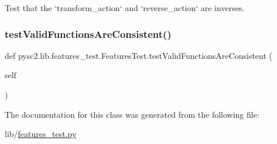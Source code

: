 \begin{DoxyVerb}Test that the `transform_action` and `reverse_action` are inverses.\end{DoxyVerb}
 \mbox{\label{classpysc2_1_1lib_1_1features__test_1_1_features_test_a174e0178a227e367c212dc99de396dab}} 
\subsubsection{\texorpdfstring{test\+Valid\+Functions\+Are\+Consistent()}{testValidFunctionsAreConsistent()}}
{\footnotesize\ttfamily def pysc2.\+lib.\+features\+\_\+test.\+Features\+Test.\+test\+Valid\+Functions\+Are\+Consistent (\begin{DoxyParamCaption}\item[{}]{self }\end{DoxyParamCaption})}



The documentation for this class was generated from the following file\+:\begin{DoxyCompactItemize}
\item 
lib/\mbox{\hyperlink{features__test_8py}{features\+\_\+test.\+py}}\end{DoxyCompactItemize}
